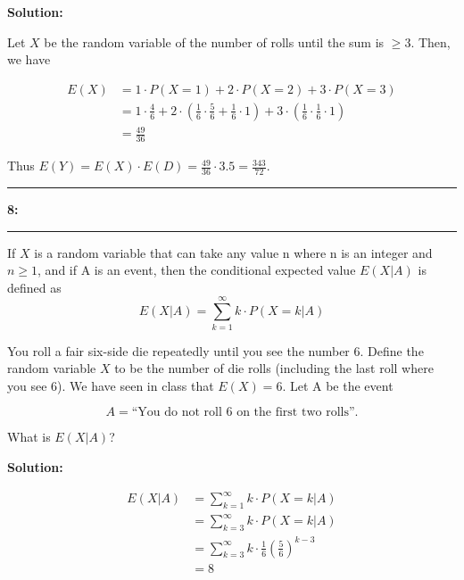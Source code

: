 \documentclass[11pt]{article}
\newcommand\question[2]{\vspace{.25in}\hrule\textbf{#1: #2}\vspace{.5em}\hrule\vspace{.10in}}
\newcommand{\solution}{\vspace{.10in}\textbf{Solution: }}
\begin{document}
\solution

Let $X$ be the random variable of the number of rolls until the sum is $\ge 3$.
Then, we have

\begin{align*}
    E(X) &= 1\cdot P(X=1) + 2\cdot P(X=2) + 3\cdot P(X=3) \\ 
         &= 1\cdot \frac{4}{6} + 2\cdot \left(\frac{1}{6}\cdot\frac{5}{6} + \frac{1}{6}\cdot 1\right) + 3\cdot\left(\frac{1}{6}\cdot\frac{1}{6}\cdot 1\right) \\
         &= \frac{49}{36}
\end{align*}

Thus $E(Y) = E(X) \cdot E(D) = \frac{49}{36} \cdot 3.5 = \frac{343}{72}$.

\question{8}{}

If $X$ is a random variable that can take any value n where n is an integer and $n \ge 1$, and if A is an event, then the conditional expected value $E(X|A)$ is defined as
\begin{equation}
    E(X|A) = \sum_{k=1}^{\infty} k\cdot P(X=k|A)
\end{equation}

You roll a fair six-side die repeatedly until you see the number 6. Define the random variable $X$ to be the number of die rolls
(including the last roll where you see 6). We have seen in class that $E(X) = 6$. Let A be the event

\[A = \text{“You do not roll 6 on the first two rolls”.}\]

What is $E(X|A)$?

\solution

\begin{align*}
    E(X|A) &= \sum_{k=1}^{\infty} k\cdot P(X=k|A) \\
           &= \sum_{k=3}^{\infty} k\cdot P(X=k|A) \\
           &= \sum_{k=3}^{\infty} k\cdot \frac{1}{6} \left(\frac{5}{6}\right)^{k-3} \\
           &= 8
\end{align*}
    
\end{document}
